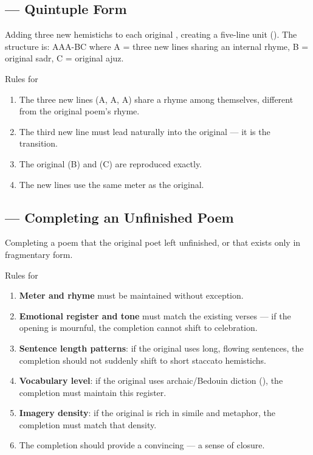 \subsection{ — Quintuple Form}
\label{subsec:takhmiis}

Adding three new hemistichs to each original , creating a five-line unit (). The structure is: AAA-BC where A = three new lines sharing an internal rhyme, B = original sadr, C = original ajuz.

\begin{rulebox}{Rules for }
\begin{enumerate}
  \item The three new lines (A, A, A) share a rhyme among themselves, different from the original poem's rhyme.
  \item The third new line must lead naturally into the original  — it is the transition.
  \item The original  (B) and  (C) are reproduced exactly.
  \item The new lines use the same meter as the original.
\end{enumerate}
\end{rulebox}

\subsection{ — Completing an Unfinished Poem}
\label{subsec:ikmal}

Completing a poem that the original poet left unfinished, or that exists only in fragmentary form.

\begin{rulebox}{Rules for }
\begin{enumerate}
  \item \textbf{Meter and rhyme} must be maintained without exception.
  \item \textbf{Emotional register and tone} must match the existing verses — if the opening is mournful, the completion cannot shift to celebration.
  \item \textbf{Sentence length patterns}: if the original uses long, flowing sentences, the completion should not suddenly shift to short staccato hemistichs.
  \item \textbf{Vocabulary level}: if the original uses archaic/Bedouin diction (), the completion must maintain this register.
  \item \textbf{Imagery density}: if the original is rich in simile and metaphor, the completion must match that density.
  \item The completion should provide a convincing  — a sense of closure.
\end{enumerate}
\end{rulebox}

